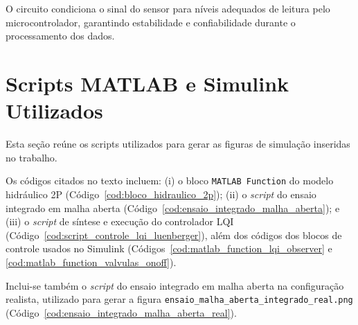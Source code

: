 O circuito condiciona o sinal do sensor para níveis adequados de leitura pelo microcontrolador, garantindo estabilidade e confiabilidade durante o processamento dos dados.

\section{Scripts MATLAB e Simulink Utilizados}
\label{ap:scripts-matlab}

Esta seção reúne os scripts utilizados para gerar as figuras de simulação inseridas no trabalho.

Os códigos citados no texto incluem: (i) o bloco \texttt{MATLAB Function} do modelo hidráulico 2P (Código~\ref{cod:bloco_hidraulico_2p}); (ii) o \textit{script} do ensaio integrado em malha aberta (Código~\ref{cod:ensaio_integrado_malha_aberta}); e (iii) o \textit{script} de síntese e execução do controlador LQI (Código~\ref{cod:script_controle_lqi_luenberger}), além dos códigos dos blocos de controle usados no Simulink (Códigos~\ref{cod:matlab_function_lqi_observer} e \ref{cod:matlab_function_valvulas_onoff}).

Inclui-se também o \textit{script} do ensaio integrado em malha aberta na configuração realista, utilizado para gerar a figura \texttt{ensaio\_malha\_aberta\_integrado\_real.png} (Código~\ref{cod:ensaio_integrado_malha_aberta_real}).


